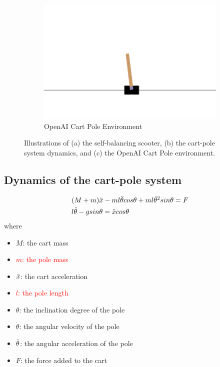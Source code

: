 \documentclass[10pt,a4paper]{article}
\begin{document}
\begin{figure}[H]
\begin{subfigure}[b]{0.3\textwidth}
			\centering
			\includegraphics[width=\textwidth]{figure/open-ai}
			\caption{OpenAI Cart Pole Environment}
			\label{fig:openai}
		\end{subfigure}
		\caption{Illustrations of (a) the self-balancing scooter, (b) the cart-pole system dynamics, and (c) the OpenAI Cart Pole environment.}
		\label{fig:three graphs}
	\end{figure}
	
	\subsection*{Dynamics of the cart-pole system}
	\begin{subequations}
		\label{eq:dynamics}
		\begin{align}
			&(M + m)\Ddot{x} - ml\Ddot{\theta}cos\theta + ml\dot{\theta}^2sin\theta = F \\
			&l\Ddot{\theta} - gsin\theta = \Ddot{x}cos\theta
		\end{align}
	\end{subequations}
	where
	\begin{multicols}{2}
		\begin{itemize}
			\item $M$: the cart mass
			\item \textcolor{red}{$m$: the pole mass}
			\item $\Ddot{x}$: the cart acceleration 
			\item \textcolor{red}{$l$: the pole length}
			\item $\theta$: the inclination degree of the pole
			\item $\dot{\theta}$: the angular velocity of the pole
			\item $\Ddot{\theta}$: the angular acceleration of the pole
			\item $F$: the force added to the cart
		\end{itemize}
	\end{multicols}
	
\end{document}
